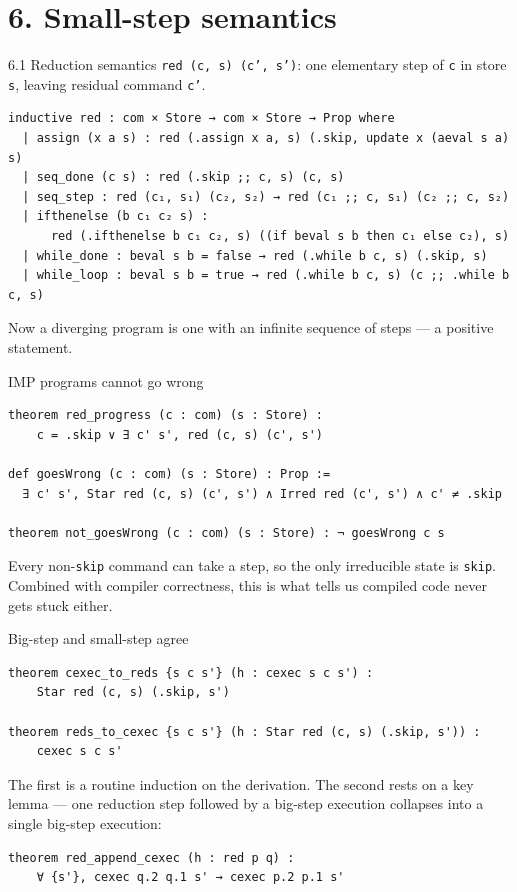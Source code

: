 \documentclass[aspectratio=169,10pt]{beamer}
\newcommand{\code}[1]{\texttt{\small #1}}
\begin{document}
\section{6. Small-step semantics}

\begin{frame}[fragile]{6.1 Reduction semantics}
\code{red (c, s) (c', s')}: one elementary step of \code{c} in store
\code{s}, leaving residual command \code{c'}.
\begin{lstlisting}
inductive red : com × Store → com × Store → Prop where
  | assign (x a s) : red (.assign x a, s) (.skip, update x (aeval s a) s)
  | seq_done (c s) : red (.skip ;; c, s) (c, s)
  | seq_step : red (c₁, s₁) (c₂, s₂) → red (c₁ ;; c, s₁) (c₂ ;; c, s₂)
  | ifthenelse (b c₁ c₂ s) :
      red (.ifthenelse b c₁ c₂, s) ((if beval s b then c₁ else c₂), s)
  | while_done : beval s b = false → red (.while b c, s) (.skip, s)
  | while_loop : beval s b = true → red (.while b c, s) (c ;; .while b c, s)
\end{lstlisting}
Now a diverging program is one with an infinite sequence of steps --- a
positive statement.
\end{frame}

\begin{frame}[fragile]{IMP programs cannot go wrong}
\begin{lstlisting}
theorem red_progress (c : com) (s : Store) :
    c = .skip ∨ ∃ c' s', red (c, s) (c', s')

def goesWrong (c : com) (s : Store) : Prop :=
  ∃ c' s', Star red (c, s) (c', s') ∧ Irred red (c', s') ∧ c' ≠ .skip

theorem not_goesWrong (c : com) (s : Store) : ¬ goesWrong c s
\end{lstlisting}
Every non-\code{skip} command can take a step, so the only irreducible state
is \code{skip}.  Combined with compiler correctness, this is what tells us
compiled code never gets stuck either.
\end{frame}

\begin{frame}[fragile]{Big-step and small-step agree}
\begin{lstlisting}
theorem cexec_to_reds {s c s'} (h : cexec s c s') :
    Star red (c, s) (.skip, s')

theorem reds_to_cexec {s c s'} (h : Star red (c, s) (.skip, s')) :
    cexec s c s'
\end{lstlisting}
The first is a routine induction on the derivation.  The second rests on a
key lemma --- one reduction step followed by a big-step execution collapses
into a single big-step execution:
\begin{lstlisting}
theorem red_append_cexec (h : red p q) :
    ∀ {s'}, cexec q.2 q.1 s' → cexec p.2 p.1 s'
\end{lstlisting}
\end{frame}
\end{document}
